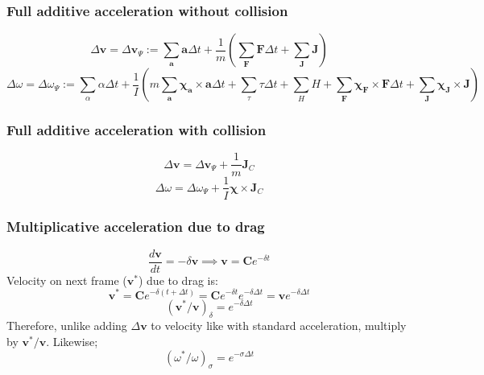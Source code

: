 \documentclass[10pt]{report}
\begin{document}
\subsubsection{Full additive acceleration without collision}
\begin{equation}\Delta\boldsymbol{v}=\Delta\boldsymbol{v}_\Psi:=\sum_{\boldsymbol{a}}\boldsymbol{a}\Delta t+\frac{1}{m}\left(\sum_{\boldsymbol{F}}\boldsymbol{F}\Delta t+\sum_{\boldsymbol{J}}\boldsymbol{J}\right)\end{equation}
\begin{equation}\Delta\omega=\Delta\omega_\Psi:=\sum_\alpha\alpha\Delta t+\frac{1}{I}\left(m\sum_{\boldsymbol{a}}\boldsymbol{\chi}_{\boldsymbol{a}}\times\boldsymbol{a}\Delta t+\sum_\tau\tau\Delta t+\sum_HH+\sum_{\boldsymbol{F}}\boldsymbol{\chi_{\boldsymbol{F}}}\times{\boldsymbol{F}}\Delta t+\sum_{\boldsymbol{J}}\boldsymbol{\chi_{\boldsymbol{J}}}\times{\boldsymbol{J}}\right)\end{equation}

\subsubsection{Full additive acceleration with collision}
\begin{equation}\Delta\boldsymbol{v}=\Delta\boldsymbol{v}_\Psi+\frac{1}{m}\boldsymbol{J}_C\end{equation}
\begin{equation}\Delta\omega=\Delta\omega_\Psi+\frac{1}{I}\boldsymbol{\chi}\times\boldsymbol{J}_C\end{equation}

\subsubsection{Multiplicative acceleration due to drag}
\begin{equation}\frac{d\boldsymbol{v}}{dt}=-\delta\boldsymbol{v}\implies\boldsymbol{v}=\boldsymbol{C}e^{-\delta t}\end{equation}
Velocity on next frame ($\boldsymbol{v}^*$) due to drag is:
\begin{equation}\boldsymbol{v}^*=\boldsymbol{C}e^{-\delta(t+\Delta t)}=\boldsymbol{C}e^{-\delta t}e^{-\delta\Delta t}=\boldsymbol{v}e^{-\delta\Delta t}\end{equation}
\begin{equation}(\boldsymbol{v}^*/\boldsymbol{v})_\delta=e^{-\delta\Delta t}\end{equation}
Therefore, unlike adding $\Delta\boldsymbol{v}$ to velocity like with standard acceleration, multiply by $\boldsymbol{v}^*/\boldsymbol{v}$. Likewise;
\begin{equation}(\omega^*/\omega)_\sigma=e^{-\sigma\Delta t}\end{equation}
\end{document}
